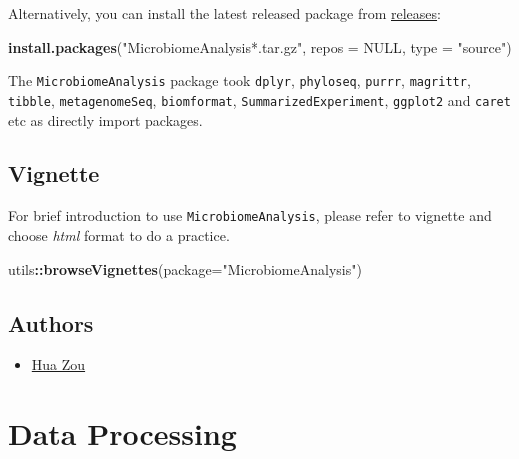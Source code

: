 \documentclass[
]{book}
\newenvironment{Shaded}{\begin{snugshade}}{\end{snugshade}}
\newcommand{\AttributeTok}[1]{\textcolor[rgb]{0.13,0.29,0.53}{#1}}
\newcommand{\ConstantTok}[1]{\textcolor[rgb]{0.56,0.35,0.01}{#1}}
\newcommand{\FunctionTok}[1]{\textcolor[rgb]{0.13,0.29,0.53}{\textbf{#1}}}
\newcommand{\NormalTok}[1]{#1}
\newcommand{\SpecialCharTok}[1]{\textcolor[rgb]{0.81,0.36,0.00}{\textbf{#1}}}
\newcommand{\StringTok}[1]{\textcolor[rgb]{0.31,0.60,0.02}{#1}}
\providecommand{\tightlist}{%
  \setlength{\itemsep}{0pt}\setlength{\parskip}{0pt}}
\begin{document}
Alternatively, you can install the latest released package from \href{https://github.com/HuaZou/MicrobiomeAnalysis/releases}{releases}:

\begin{Shaded}
\begin{Highlighting}[]
\FunctionTok{install.packages}\NormalTok{(}\StringTok{"MicrobiomeAnalysis*.tar.gz"}\NormalTok{, }\AttributeTok{repos =} \ConstantTok{NULL}\NormalTok{, }\AttributeTok{type =} \StringTok{"source"}\NormalTok{)}
\end{Highlighting}
\end{Shaded}

The \texttt{MicrobiomeAnalysis} package took \texttt{dplyr}, \texttt{phyloseq}, \texttt{purrr}, \texttt{magrittr}, \texttt{tibble}, \texttt{metagenomeSeq}, \texttt{biomformat}, \texttt{SummarizedExperiment}, \texttt{ggplot2} and \texttt{caret} etc as directly import packages.

\hypertarget{vignette}{%
\section{Vignette}\label{vignette}}

For brief introduction to use \texttt{MicrobiomeAnalysis}, please refer to vignette and choose \emph{html} format to do a practice.

\begin{Shaded}
\begin{Highlighting}[]
\NormalTok{utils}\SpecialCharTok{::}\FunctionTok{browseVignettes}\NormalTok{(}\AttributeTok{package=}\StringTok{"MicrobiomeAnalysis"}\NormalTok{)}
\end{Highlighting}
\end{Shaded}

\hypertarget{authors}{%
\section{Authors}\label{authors}}

\begin{itemize}
\tightlist
\item
  \href{mailto:zouhua1@outlook.com}{Hua Zou}
\end{itemize}

\hypertarget{data-processing}{%
\chapter{Data Processing}\label{data-processing}}
\end{document}
